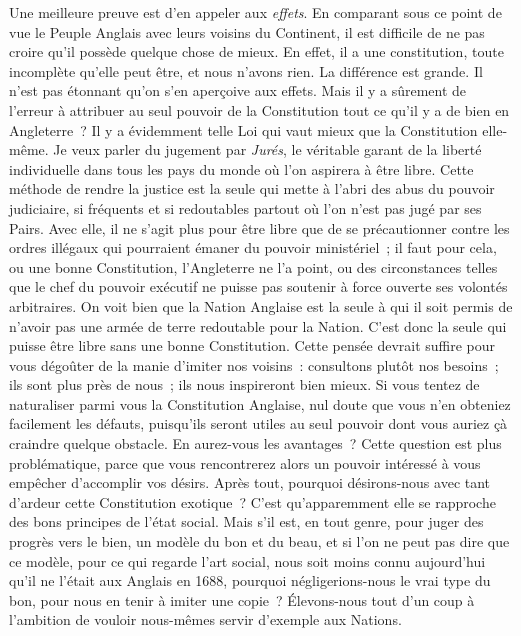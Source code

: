 \documentclass[french,twoside]{book} %
\begin{document}
Une meilleure preuve est d’en appeler aux {\itshape effets}. En comparant sous ce point de vue le Peuple Anglais avec leurs voisins du Continent, il est difficile de ne pas croire qu’il possède quelque chose de mieux. En effet, il a une constitution, toute incomplète qu’elle peut être, et nous n’avons rien. La différence est grande. Il n’est pas étonnant qu’on s’en aperçoive aux effets. Mais il y a sûrement de l’erreur à attribuer au seul pouvoir de la Constitution tout ce qu’il y a de bien en Angleterre ? Il y a évidemment telle Loi qui vaut mieux que la Constitution elle-même. Je veux parler du jugement par {\itshape Jurés}, le véritable garant de la liberté individuelle dans tous les pays du monde où l’on aspirera à être libre. Cette méthode de rendre la justice est la seule qui mette à l’abri des abus du pouvoir judiciaire, si fréquents et si redoutables partout où l’on n’est pas jugé par ses Pairs. Avec elle, il ne s’agit plus pour être libre que de se précautionner contre les ordres illégaux qui pourraient émaner du pouvoir ministériel ; il faut pour cela, ou une bonne Constitution, l’Angleterre ne l’a point, ou des circonstances telles que le chef du pouvoir exécutif ne puisse pas soutenir à force ouverte ses volontés arbitraires. On voit bien que la Nation Anglaise est la seule à qui il soit permis de n’avoir pas une armée de terre redoutable pour la Nation. C’est donc la seule qui puisse être libre sans une bonne Constitution. Cette pensée devrait suffire pour vous dégoûter de la manie d’imiter nos voisins : consultons plutôt nos besoins ; ils sont plus près de nous ; ils nous inspireront bien mieux. Si vous tentez de naturaliser parmi vous la Constitution Anglaise, nul doute que vous n’en obteniez facilement les défauts, puisqu’ils seront utiles au seul pouvoir dont vous auriez çà craindre quelque obstacle. En aurez-vous les avantages ? Cette question est plus problématique, parce que vous rencontrerez alors un pouvoir intéressé à vous empêcher d’accomplir vos désirs. Après tout, pourquoi désirons-nous avec tant d’ardeur cette Constitution exotique ? C’est qu’apparemment elle se rapproche des bons principes de l’état social. Mais s’il est, en tout genre, pour juger des progrès vers le bien, un modèle du bon et du beau, et si l’on ne peut pas dire que ce modèle, pour ce qui regarde l’art social, nous soit moins connu aujourd’hui qu’il ne l’était aux Anglais en 1688, pourquoi négligerions-nous le vrai type du bon, pour nous en tenir à imiter une copie ? Élevons-nous tout d’un coup à l’ambition de vouloir nous-mêmes servir d’exemple aux Nations.\par
\end{document}
